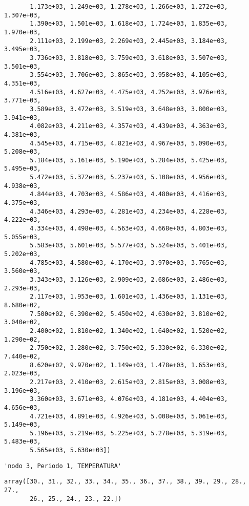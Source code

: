 \documentclass[11pt]{article}
\begin{document}
\begin{verbatim}
       1.173e+03, 1.249e+03, 1.278e+03, 1.266e+03, 1.272e+03, 1.307e+03,
       1.390e+03, 1.501e+03, 1.618e+03, 1.724e+03, 1.835e+03, 1.970e+03,
       2.111e+03, 2.199e+03, 2.269e+03, 2.445e+03, 3.184e+03, 3.495e+03,
       3.736e+03, 3.818e+03, 3.759e+03, 3.618e+03, 3.507e+03, 3.501e+03,
       3.554e+03, 3.706e+03, 3.865e+03, 3.958e+03, 4.105e+03, 4.351e+03,
       4.516e+03, 4.627e+03, 4.475e+03, 4.252e+03, 3.976e+03, 3.771e+03,
       3.589e+03, 3.472e+03, 3.519e+03, 3.648e+03, 3.800e+03, 3.941e+03,
       4.082e+03, 4.211e+03, 4.357e+03, 4.439e+03, 4.363e+03, 4.381e+03,
       4.545e+03, 4.715e+03, 4.821e+03, 4.967e+03, 5.090e+03, 5.208e+03,
       5.184e+03, 5.161e+03, 5.190e+03, 5.284e+03, 5.425e+03, 5.495e+03,
       5.472e+03, 5.372e+03, 5.237e+03, 5.108e+03, 4.956e+03, 4.938e+03,
       4.844e+03, 4.703e+03, 4.586e+03, 4.480e+03, 4.416e+03, 4.375e+03,
       4.346e+03, 4.293e+03, 4.281e+03, 4.234e+03, 4.228e+03, 4.222e+03,
       4.334e+03, 4.498e+03, 4.563e+03, 4.668e+03, 4.803e+03, 5.055e+03,
       5.583e+03, 5.601e+03, 5.577e+03, 5.524e+03, 5.401e+03, 5.202e+03,
       4.785e+03, 4.580e+03, 4.170e+03, 3.970e+03, 3.765e+03, 3.560e+03,
       3.343e+03, 3.126e+03, 2.909e+03, 2.686e+03, 2.486e+03, 2.293e+03,
       2.117e+03, 1.953e+03, 1.601e+03, 1.436e+03, 1.131e+03, 8.680e+02,
       7.500e+02, 6.390e+02, 5.450e+02, 4.630e+02, 3.810e+02, 3.040e+02,
       2.400e+02, 1.810e+02, 1.340e+02, 1.640e+02, 1.520e+02, 1.290e+02,
       2.750e+02, 3.280e+02, 3.750e+02, 5.330e+02, 6.330e+02, 7.440e+02,
       8.620e+02, 9.970e+02, 1.149e+03, 1.478e+03, 1.653e+03, 2.023e+03,
       2.217e+03, 2.410e+03, 2.615e+03, 2.815e+03, 3.008e+03, 3.196e+03,
       3.360e+03, 3.671e+03, 4.076e+03, 4.181e+03, 4.404e+03, 4.656e+03,
       4.721e+03, 4.891e+03, 4.926e+03, 5.008e+03, 5.061e+03, 5.149e+03,
       5.196e+03, 5.219e+03, 5.225e+03, 5.278e+03, 5.319e+03, 5.483e+03,
       5.565e+03, 5.630e+03])
    \end{verbatim}

    
    
    \begin{verbatim}
'nodo 3, Periodo 1, TEMPERATURA'
    \end{verbatim}

    
    
    \begin{verbatim}
array([30., 31., 32., 33., 34., 35., 36., 37., 38., 39., 29., 28., 27.,
       26., 25., 24., 23., 22.])
    \end{verbatim}

    
    
\end{document}
